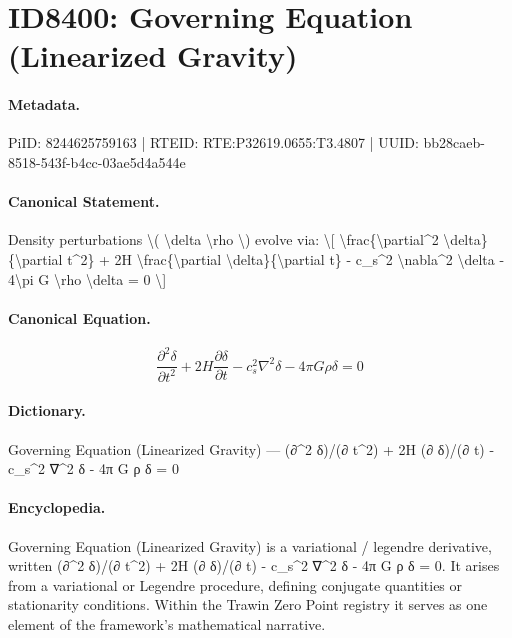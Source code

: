 \section*{ID8400: Governing Equation (Linearized Gravity)}
\paragraph{Metadata.}
PiID: 8244625759163 | RTEID: RTE:P32619.0655:T3.4807 | UUID: bb28caeb-8518-543f-b4cc-03ae5d4a544e

\paragraph{Canonical Statement.}
Density perturbations \textbackslash{}( \textbackslash{}delta \textbackslash{}rho \textbackslash{}) evolve via: \textbackslash{}[ \textbackslash{}frac\{\textbackslash{}partial\textasciicircum{}2 \textbackslash{}delta\}\{\textbackslash{}partial t\textasciicircum{}2\} + 2H \textbackslash{}frac\{\textbackslash{}partial \textbackslash{}delta\}\{\textbackslash{}partial t\} - c\_s\textasciicircum{}2 \textbackslash{}nabla\textasciicircum{}2 \textbackslash{}delta - 4\textbackslash{}pi G \textbackslash{}rho \textbackslash{}delta = 0 \textbackslash{}]

\paragraph{Canonical Equation.}
\[
\frac{\partial^2 \delta}{\partial t^2} + 2H \frac{\partial \delta}{\partial t} - c_s^2 \nabla^2 \delta - 4\pi G \rho \delta = 0
\]

\paragraph{Dictionary.}
Governing Equation (Linearized Gravity) — (∂\textasciicircum{}2 δ)/(∂ t\textasciicircum{}2) + 2H (∂ δ)/(∂ t) - c\_s\textasciicircum{}2 ∇\textasciicircum{}2 δ - 4π G ρ δ = 0

\paragraph{Encyclopedia.}
Governing Equation (Linearized Gravity) is a variational / legendre derivative, written (∂\textasciicircum{}2 δ)/(∂ t\textasciicircum{}2) + 2H (∂ δ)/(∂ t) - c\_s\textasciicircum{}2 ∇\textasciicircum{}2 δ - 4π G ρ δ = 0. It arises from a variational or Legendre procedure, defining conjugate quantities or stationarity conditions. Within the Trawin Zero Point registry it serves as one element of the framework's mathematical narrative.
